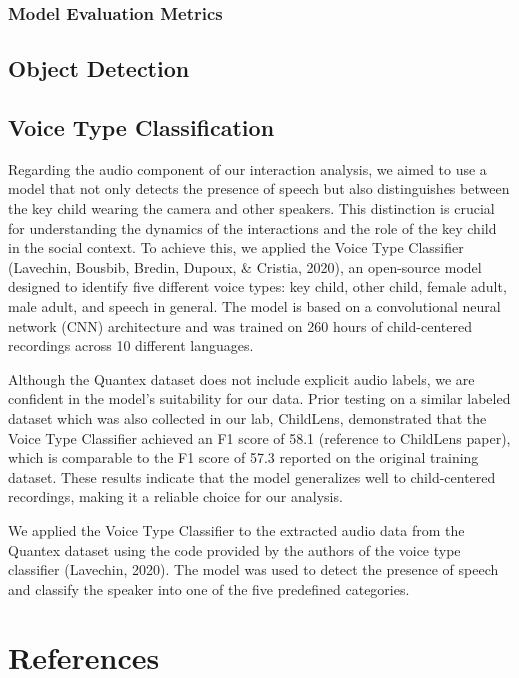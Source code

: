 \documentclass[
  man,floatsintext]{apa6}
\begin{document}
\subsubsection{Model Evaluation Metrics}\label{model-evaluation-metrics-1}

\subsection{Object Detection}\label{object-detection-1}

\subsection{Voice Type Classification}\label{voice-type-classification}

Regarding the audio component of our interaction analysis, we aimed to use a model that not only detects the presence of speech but also distinguishes between the key child wearing the camera and other speakers. This distinction is crucial for understanding the dynamics of the interactions and the role of the key child in the social context. To achieve this, we applied the Voice Type Classifier (Lavechin, Bousbib, Bredin, Dupoux, \& Cristia, 2020), an open-source model designed to identify five different voice types: key child, other child, female adult, male adult, and speech in general. The model is based on a convolutional neural network (CNN) architecture and was trained on 260 hours of child-centered recordings across 10 different languages.

Although the Quantex dataset does not include explicit audio labels, we are confident in the model's suitability for our data. Prior testing on a similar labeled dataset which was also collected in our lab, ChildLens, demonstrated that the Voice Type Classifier achieved an F1 score of 58.1 (reference to ChildLens paper), which is comparable to the F1 score of 57.3 reported on the original training dataset. These results indicate that the model generalizes well to child-centered recordings, making it a reliable choice for our analysis.

We applied the Voice Type Classifier to the extracted audio data from the Quantex dataset using the code provided by the authors of the voice type classifier (Lavechin, 2020). The model was used to detect the presence of speech and classify the speaker into one of the five predefined categories.

\newpage

\section{References}\label{references-1}
\end{document}
